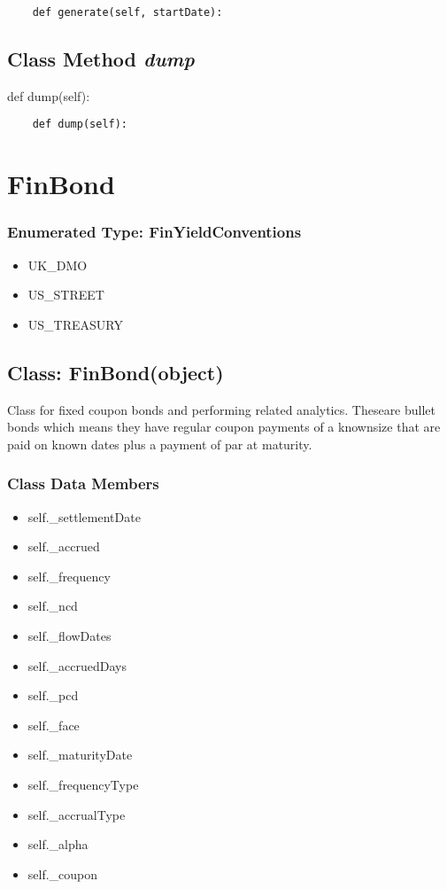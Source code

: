 \documentclass[twoside,11pt]{book}
\begin{document}
\begin{lstlisting}
    def generate(self, startDate):
\end{lstlisting}

\subsection{Class Method {\it dump}}
def dump(self):

\begin{lstlisting}
    def dump(self):
\end{lstlisting}

\newpage
\section{FinBond}

\subsubsection{Enumerated Type: FinYieldConventions}
\begin{itemize}
\item{UK\_DMO}
\item{US\_STREET}
\item{US\_TREASURY}
\end{itemize}

\subsection{Class: FinBond(object)}
Class for fixed coupon bonds and performing related analytics. Theseare bullet bonds which means they have regular coupon payments of a knownsize that are paid on known dates plus a payment of par at maturity.

\subsubsection{Class Data Members}
\begin{itemize}
\item{self.\_settlementDate}
\item{self.\_accrued}
\item{self.\_frequency}
\item{self.\_ncd}
\item{self.\_flowDates}
\item{self.\_accruedDays}
\item{self.\_pcd}
\item{self.\_face}
\item{self.\_maturityDate}
\item{self.\_frequencyType}
\item{self.\_accrualType}
\item{self.\_alpha}
\item{self.\_coupon}
\end{itemize}
\end{document}
